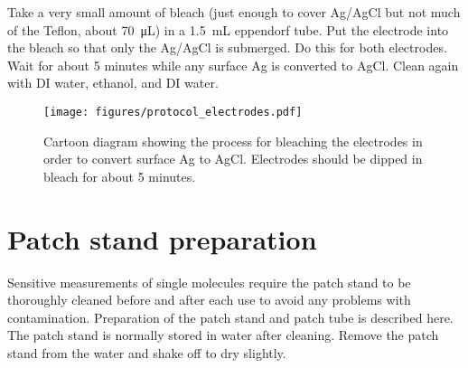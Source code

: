 Take a very small amount of bleach (just enough to cover Ag/AgCl but not much of the Teflon, about \SI{70}{\micro\liter}) in a \SI{1.5}{\mL} eppendorf tube.  Put the electrode into the bleach so that only the Ag/AgCl is submerged.  Do this for both electrodes.  Wait for about \num{5} minutes while any surface Ag is converted to AgCl.  Clean again with DI water, ethanol, and DI water.

\begin{figure}[h]
\begin{centering}
\texttt{[image: figures/protocol\_electrodes.pdf]}
\caption[Preparing silver chloride electrodes]{Cartoon diagram showing the process for bleaching the electrodes in order to convert surface Ag to AgCl.  Electrodes should be dipped in bleach for about 5 minutes.}
\label{fig:protocol_electrodes}
\end{centering}
\end{figure}

\section{Patch stand preparation}

Sensitive measurements of single molecules require the patch stand to be thoroughly cleaned before and after each use to avoid any problems with contamination.  Preparation of the patch stand and patch tube is described here.  The patch stand is normally stored in water after cleaning.  Remove the patch stand from the water and shake off to dry slightly.

